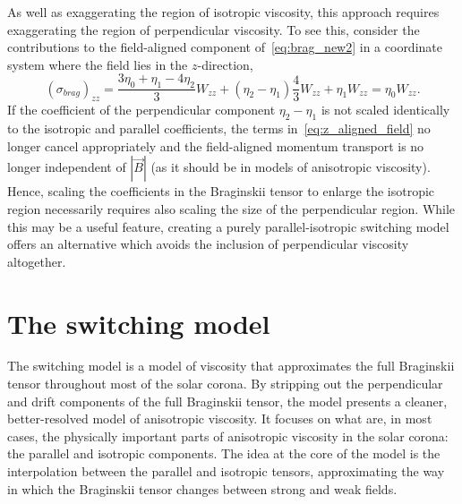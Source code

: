 As well as exaggerating the region of isotropic viscosity, this approach requires exaggerating the region of perpendicular viscosity. To see this, consider the contributions to the field-aligned component of~\eqref{eq:brag_new2} in a coordinate system where the field lies in the $z$-direction,
\begin{equation}
  \label{eq:z_aligned_field}
(\sigma_{brag})_{zz} = \frac{3\eta_0+\eta_1-4\eta_2}{3} W_{zz} + (\eta_2 - \eta_1) \frac{4}{3} W_{zz} + \eta_1 W_{zz} = \eta_0 W_{zz}.
\end{equation}
If the coefficient of the perpendicular component $\eta_2 - \eta_1$ is not scaled identically to the isotropic and parallel coefficients, the terms in~\eqref{eq:z_aligned_field} no longer cancel appropriately and the field-aligned momentum transport is no longer independent of $|\vec{B}|$ (as it should be in models of anisotropic viscosity). Hence, scaling the coefficients in the Braginskii tensor to enlarge the isotropic region necessarily requires also scaling the size of the perpendicular region. While this may be a useful feature, creating a purely parallel-isotropic switching model offers an alternative which avoids the inclusion of perpendicular viscosity altogether.


\section{The switching model}

The switching model is a model of viscosity that approximates the full Braginskii tensor throughout most of the solar corona. By stripping out the perpendicular and drift components of the full Braginskii tensor, the model presents a cleaner, better-resolved model of anisotropic viscosity. It focuses on what are, in most cases, the physically important parts of anisotropic viscosity in the solar corona: the parallel and isotropic components. The idea at the core of the model is the interpolation between the parallel and isotropic tensors, approximating the way in which the Braginskii tensor changes between strong and weak fields.

